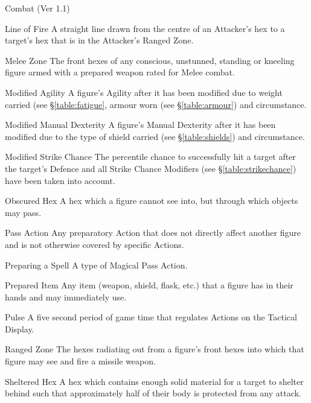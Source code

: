 \begin{Chapter}{Combat (Ver 1.1)}
\begin{Description}
\item[Line of Fire] A straight line drawn from the centre of an
  Attacker’s hex to a target’s hex that is in the Attacker’s Ranged
  Zone.

\item[Melee Zone] The front hexes of any conscious, unstunned,
  standing or kneeling figure armed with a prepared weapon rated for
  Melee combat.

\item[Modified Agility] A figure’s Agility after it has been modified
  due to weight carried (see \S\ref{table:fatigue}, armour worn (see
  \S\ref{table:armour}) and circumstance.

\item[Modified Manual Dexterity] A figure’s Manual Dexterity after it
  has been modified due to the type of shield carried (see
  \S\ref{table:shields}) and circumstance.

\item[Modified Strike Chance] The percentile chance to successfully
  hit a target after the target’s Defence and all Strike Chance
  Modifiers (see \S\ref{table:strikechance}) have been taken into
  account.

\item[Obscured Hex] A hex which a figure cannot see into, but through
  which objects may pass.

\item[Pass Action] Any preparatory Action that does not directly
  affect another figure and is not otherwise covered by specific
  Actions.

\item[Preparing a Spell] A type of Magical Pass Action.

\item[Prepared Item] Any item (weapon, shield, flask, etc.) that a
  figure has in their hands and may immediately use.

\item[Pulse] A five second period of game time that regulates Actions
  on the Tactical Display.

\item[Ranged Zone] The hexes radiating out from a figure’s front hexes
  into which that figure may see and fire a missile weapon.

\item[Sheltered Hex] A hex which contains enough solid material for a
  target to shelter behind such that approximately half of their body
  is protected from any attack.


\end{Description}
\end{Chapter}
